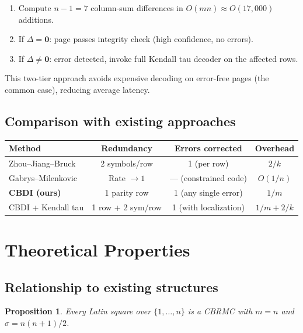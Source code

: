 \documentclass[11pt]{article}
\newtheorem{proposition}[theorem]{Proposition}
\begin{document}
\begin{enumerate}
\item Compute $n-1 = 7$ column-sum differences in $O(mn) \approx O(17{,}000)$ additions.
\item If $\Delta = \mathbf{0}$: page passes integrity check (high confidence, no errors).
\item If $\Delta \neq \mathbf{0}$: error detected, invoke full Kendall tau decoder on the affected rows.
\end{enumerate}

This two-tier approach avoids expensive decoding on error-free pages (the common case), reducing average latency.

\subsection{Comparison with existing approaches}

\begin{center}
\renewcommand{\arraystretch}{1.3}
\begin{tabular}{lccc}
\toprule
Method & Redundancy & Errors corrected & Overhead \\
\midrule
Zhou--Jiang--Bruck~\cite{zhou2015} & 2 symbols/row & 1 (per row) & $2/k$ \\
Gabrys--Milenkovic~\cite{gabrys2016} & Rate $\to 1$ & --- (constrained code) & $O(1/n)$ \\
\textbf{CBDI (ours)} & 1 parity row & 1 (any single error) & $1/m$ \\
CBDI + Kendall tau & 1 row + 2 sym/row & 1 (with localization) & $1/m + 2/k$ \\
\bottomrule
\end{tabular}
\end{center}

\section{Theoretical Properties}
\label{sec:theory}

\subsection{Relationship to existing structures}

\begin{proposition}
Every Latin square over $\{1,\dots,n\}$ is a CBRMC with $m = n$ and $\sigma = n(n+1)/2$.
\end{proposition}
\end{document}
